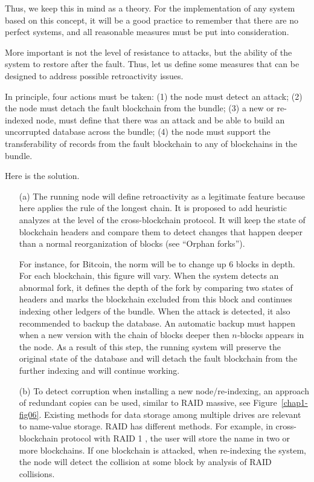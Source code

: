 \begin{multicols}{2}
Thus, we keep this in mind as a theory. For the implementation of any system based on this concept, it will be a good practice to remember that there are no perfect systems, and all reasonable measures must be put into consideration.

More important is not the level of resistance to attacks, but the ability of the system to restore after the fault. Thus, let us define some measures that can be designed to address possible retroactivity issues.

In principle, four actions must be taken: (1) the node must detect an attack; (2) the node must detach the fault blockchain from the bundle; (3) a new or re-indexed node, must define that there was an attack and be able to build an uncorrupted database across the bundle; (4) the node must support the transferability of records from the fault blockchain to any of blockchains in the bundle.

Here is the solution.
\begin{itemize}
\item[(a)] The running node will define retroactivity as a legitimate feature because here applies the rule of the longest chain. It is proposed to add heuristic analyzes at the level of the cross-blockchain protocol. It will keep the state of blockchain headers and compare them to detect changes that happen deeper than a normal reorganization of blocks (see “Orphan forks”).

For instance, for Bitcoin, the norm will be to change up 6 blocks in depth. For each blockchain, this figure will vary. When the system detects an abnormal fork, it defines the depth of the fork by comparing two states of headers and marks the blockchain excluded from this block and continues indexing other ledgers of the bundle. When the attack is detected, it also recommended to backup the database. An automatic backup must happen when a new version with the chain of blocks deeper then $n$‑blocks appears in the node. As a result of this step, the running system will preserve the original state of the database and will detach the fault blockchain from the further indexing and will continue working.

\item[(b)] To detect corruption when installing a new node/re-indexing, an approach of redundant copies can be used, similar to RAID massive, see Figure~\ref{chap1-fig06}. Existing methods for data storage among multiple drives are relevant to name-value storage. RAID has different methods. For example, in cross-blockchain protocol with RAID 1 \cite{art1-key41}, the user will store the name in two or more blockchains. If one blockchain is attacked, when re-indexing the system, the node will detect the collision at some block by analysis of RAID collisions.


\end{itemize}
\end{multicols}
